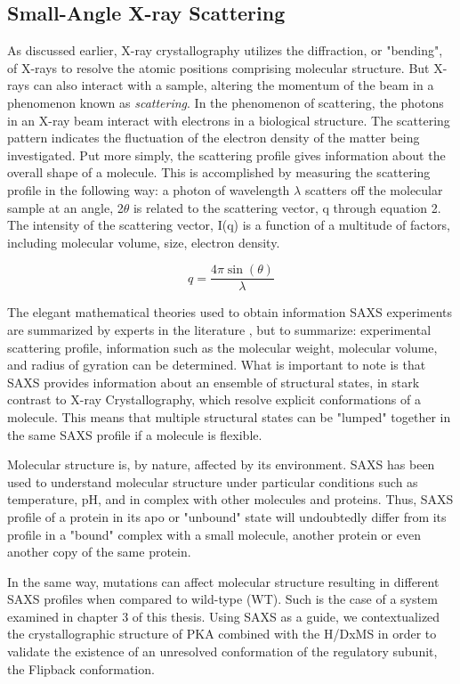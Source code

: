 \documentclass[12pt]{ucsddissertation}
\begin{document}
\begin{dissertationintroduction}
\subsection{Small-Angle X-ray Scattering}
As discussed earlier, X-ray crystallography utilizes the diffraction, or "bending", of X-rays to resolve the atomic positions comprising molecular structure. But X-rays can also interact with a sample, altering the momentum of the beam in a phenomenon known as \textit{scattering}. In the phenomenon of scattering, the photons in an X-ray beam interact with electrons in a biological structure. The scattering pattern indicates the fluctuation of the electron density of the matter being investigated. Put more simply, the scattering profile gives information about the overall shape of a molecule. This is accomplished by measuring the scattering profile in the following way: a photon of wavelength $\lambda$ scatters off the molecular sample at an angle, 2$\theta$ is related to the scattering vector, q through equation 2. The intensity of the scattering vector, I(q) is a function of a multitude of factors, including molecular volume, size, electron density. 

\begin{equation}
    q = \frac { 4 \pi \sin ( \theta ) } { \lambda }
\end{equation}

The elegant mathematical theories used to obtain information SAXS experiments are summarized by experts in the literature \cite{Boldon2015}, but to summarize: experimental scattering profile, information such as the molecular weight, molecular volume, and radius of gyration can be determined. What is important to note is that SAXS provides information about an ensemble of structural states, in stark contrast to X-ray Crystallography, which resolve explicit conformations of a molecule. This means that multiple structural states can be "lumped" together in the same SAXS profile if a molecule is flexible. 

 Molecular structure is, by nature, affected by its environment. SAXS has been used to understand molecular structure under particular conditions such as temperature, pH\cite{Carvalho2012}, and in complex with other molecules and proteins\cite{Cheng2009}. Thus, SAXS profile of a protein in its apo or "unbound" state will undoubtedly differ from its profile in a "bound" complex with a small molecule, another protein or even another copy of the same protein. 
 
 In the same way, mutations can affect molecular structure resulting in different SAXS profiles when compared to wild-type (WT). Such is the case of a system examined in chapter 3 of this thesis. Using SAXS as a guide, we contextualized the crystallographic structure of PKA combined with the H/DxMS in order to validate the existence of an unresolved conformation of the regulatory subunit, the Flipback conformation.
 

\end{dissertationintroduction}
\end{document}
